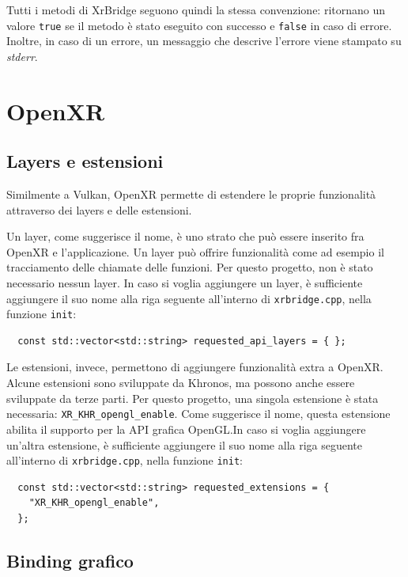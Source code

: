\documentclass[twoside]{supsistudent}
\begin{document}
Tutti i metodi di XrBridge seguono quindi la stessa convenzione: ritornano un valore \texttt{true} se il metodo è stato eseguito con successo e \texttt{false} in caso di errore. Inoltre, in caso di un errore, un messaggio che descrive l'errore viene stampato su \textit{stderr}.

\section{OpenXR}

\subsection{Layers e estensioni}

Similmente a Vulkan, OpenXR permette di estendere le proprie funzionalità attraverso dei layers e delle estensioni.

Un layer, come suggerisce il nome, è uno strato che può essere inserito fra OpenXR e l'applicazione. Un layer può offrire funzionalità come ad esempio il tracciamento delle chiamate delle funzioni. Per questo progetto, non è stato necessario nessun layer. In caso si voglia aggiungere un layer, è sufficiente aggiungere il suo nome alla riga seguente all'interno di \texttt{xrbridge.cpp}, nella funzione \texttt{init}:

\begin{verbatim}
  const std::vector<std::string> requested_api_layers = { };
\end{verbatim}

Le estensioni, invece, permettono di aggiungere funzionalità extra a OpenXR. Alcune estensioni sono sviluppate da Khronos, ma possono anche essere sviluppate da terze parti. Per questo progetto, una singola estensione è stata necessaria: \texttt{XR\_KHR\_opengl\_enable}. Come suggerisce il nome, questa estensione abilita il supporto per la API grafica OpenGL.In caso si voglia aggiungere un'altra estensione, è sufficiente aggiungere il suo nome alla riga seguente all'interno di \texttt{xrbridge.cpp}, nella funzione \texttt{init}:

\begin{verbatim}
  const std::vector<std::string> requested_extensions = {
    "XR_KHR_opengl_enable",
  };
\end{verbatim}

\subsection{Binding grafico}
\end{document}
